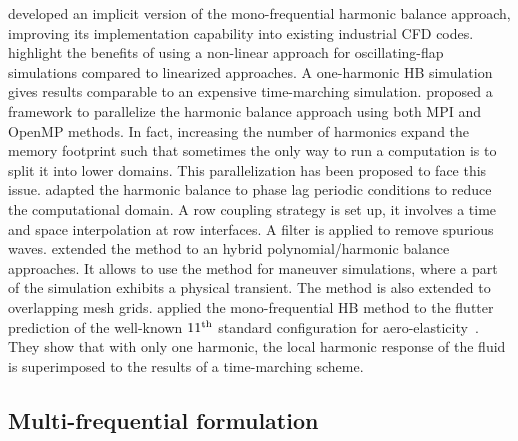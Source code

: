 \citet{JSicot2008} developed an implicit
version of the mono-frequential harmonic
balance approach, improving its implementation
capability into existing industrial CFD codes.
\citet{JDufour2009} highlight the benefits of using a 
non-linear approach for oscillating-flap simulations
compared to linearized approaches. A one-harmonic HB simulation
gives results comparable to an expensive time-marching simulation.
\citet{Jackson2011} proposed a framework to 
parallelize the harmonic balance approach using
both MPI and OpenMP methods. In fact, increasing the
number of harmonics expand the memory footprint such
that sometimes the only way to run a computation is 
to split it into lower domains. This parallelization
has been proposed to face this issue. 
\citet{JSicot2012} adapted the harmonic balance 
to phase lag periodic 
conditions to reduce the computational domain. 
A row coupling strategy is set up, it involves 
a time and space interpolation at row interfaces.
A filter is applied to remove spurious waves.
\citet{Mavriplis2012} extended the method to 
an hybrid polynomial/harmonic balance approaches. 
It allows to use the method for maneuver simulations, 
where a part of the simulation exhibits a physical transient.
The method is also extended to overlapping mesh grids.
\citet{Huang2013} applied the mono-frequential
HB method to the flutter prediction of the 
well-known $11\textsuperscript{th}$ 
standard configuration for aero-elasticity~\cite{Fransson1999}.
They show that with only one harmonic, the local
harmonic response of the fluid is superimposed
to the results of a time-marching scheme.

\subsection{Multi-frequential formulation}

